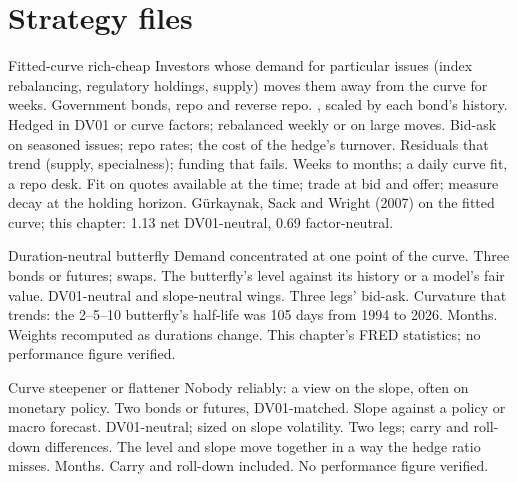 \section{Strategy files}

\begin{strategyfile}{Fitted-curve rich-cheap}\label{strat:s2:government-bond-relative-value:richcheap}
 Investors whose demand for particular issues (index rebalancing, regulatory holdings, supply) moves them away from the
curve for weeks.
 Government bonds, repo and reverse repo.
 , scaled by each bond's history.
 Hedged in DV01 or curve factors; rebalanced weekly or on large moves.
 Bid-ask on seasoned issues; repo rates; the cost of the hedge's turnover.
 Residuals that trend (supply, specialness); funding that fails.
 Weeks to months; a daily curve fit, a repo desk.
 Fit on quotes available at the time; trade at bid and offer; measure decay at the holding horizon.
 Gürkaynak, Sack and Wright (2007) on the fitted curve; this chapter: 1.13 net DV01-neutral, 0.69 factor-neutral.
\end{strategyfile}

\begin{strategyfile}{Duration-neutral butterfly}\label{strat:s2:government-bond-relative-value:fly}
 Demand concentrated at one point of the curve.
 Three bonds or futures; swaps.
 The butterfly's level against its history or a model's fair value.
 DV01-neutral and slope-neutral wings.
 Three legs' bid-ask.
 Curvature that trends: the 2--5--10 butterfly's half-life was 105 days from 1994 to 2026.
 Months.
 Weights recomputed as durations change.
 This chapter's FRED statistics; no performance figure verified.
\end{strategyfile}

\begin{strategyfile}{Curve steepener or flattener}\label{strat:s2:government-bond-relative-value:curve}
 Nobody reliably: a view on the slope, often on monetary policy.
 Two bonds or futures, DV01-matched.
 Slope against a policy or macro forecast.
 DV01-neutral; sized on slope volatility.
 Two legs; carry and roll-down differences.
 The level and slope move together in a way the hedge ratio misses.
 Months.
 Carry and roll-down included.
 No performance figure verified.
\end{strategyfile}

